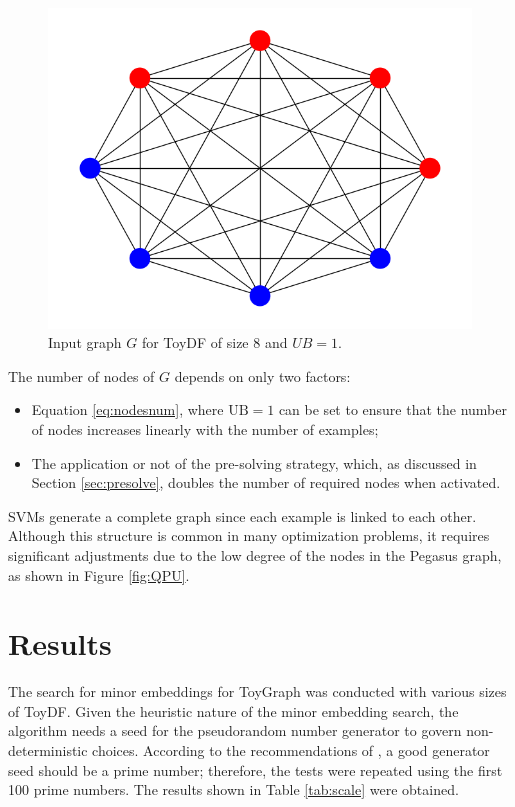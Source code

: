 \begin{figure}[H]
    \centering
    \includegraphics[scale=0.5]{figures/toygraph.png}
    \caption{Input graph $G$ for ToyDF of size $8$ and $UB=1$.}
    \label{fig:toydfgraph}
\end{figure}

The number of nodes of $G$ depends on only two factors:

\begin{itemize} 
	\item Equation \ref{eq:nodesnum}, where $\text{UB} = 1$ can be set to ensure that the number of nodes increases linearly with the number of examples; 
	\item The application or not of the pre-solving strategy, which, as discussed in Section \ref{sec:presolve}, doubles the number of required nodes when activated. 
\end{itemize}

SVMs generate a complete graph since each example is linked to each other. 
Although this structure is common in many optimization problems, it requires significant adjustments due to the low degree of the nodes in the Pegasus graph, as shown in Figure \ref{fig:QPU}.

\section{Results}\label{sec:qpu-res}

The search for minor embeddings for ToyGraph was conducted with various sizes of ToyDF. 
Given the heuristic nature of the minor embedding search, the algorithm needs a seed for the pseudorandom number generator to govern non-deterministic choices. 
According to the recommendations of \cite{random}, a good generator seed should be a prime number; therefore, the tests were repeated using the first 100 prime numbers.
The results shown in Table \ref{tab:scale} were obtained.

